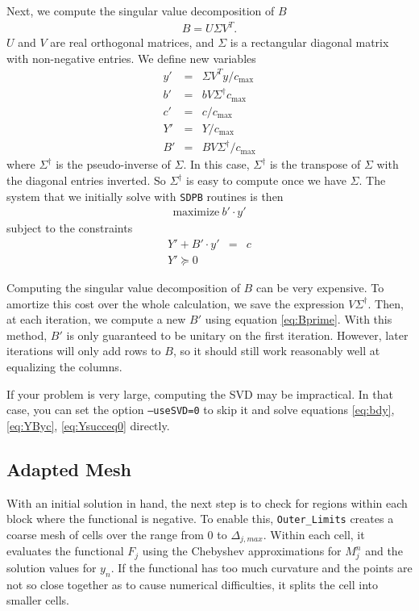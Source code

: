 \documentclass[12pt]{article}
\numberwithin{equation}{section}
\begin{document}
Next, we compute the singular value decomposition of $B$
\begin{eqnarray}
  B = U \Sigma V^T.
\end{eqnarray}
$U$ and $V$ are real orthogonal matrices, and $\Sigma$ is a rectangular
diagonal matrix with non-negative entries.  We define new
variables
\begin{eqnarray}
  y' & = & \Sigma V^T y/c_{\max}\\
  b' & = & b V \Sigma^{\dagger}c_{\max}\\
  c' & = & c/c_{\max}\\
  Y' & = & Y/c_{\max}\\
  B' & = & B V \Sigma^{\dagger}/c_{\max}
           \label{eq:Bprime}
\end{eqnarray}
where $\Sigma^{\dagger}$ is the pseudo-inverse of $\Sigma$.  In this
case, $\Sigma^{\dagger}$ is the transpose of $\Sigma$ with the
diagonal entries inverted.  So $\Sigma^{\dagger}$ is easy to compute
once we have $\Sigma$.  The system that we initially solve with
\texttt{SDPB} routines is then
\begin{eqnarray}
  \textrm{maximize}~b'\cdot y'
\end{eqnarray}
subject to the constraints
\begin{eqnarray}
  Y' + B'\cdot y' & = & c\\
  Y' \succeq 0
\end{eqnarray}

Computing the singular value decomposition of $B$ can be very
expensive.  To amortize this cost over the whole calculation, we
save the expression $V \Sigma^{\dagger}$.  Then, at each iteration, we
compute a new $B'$ using equation \ref{eq:Bprime}.  With this method,
$B'$ is only guaranteed to be unitary on the first iteration.
However, later iterations will only add rows to $B$, so it should
still work reasonably well at equalizing the columns.

If your problem is very large, computing the SVD may be impractical.
In that case, you can set the option \texttt{--useSVD=0} to skip it
and solve equations \ref{eq:bdy}, \ref{eq:YByc}, \ref{eq:Ysucceq0}
directly.

\subsection{Adapted Mesh}
\label{subsec:adaptedmesh}

With an initial solution in hand, the next step is to check for
regions within each block where the functional is negative.  To enable
this, \texttt{Outer\_Limits} creates a coarse mesh of
cells over the range from $0$ to $\Delta_{j,max}$.  Within each cell,
it evaluates the functional $F_j$ using the Chebyshev approximations
for $M_j^n$ and the solution values for $y_n$.  If the functional has
too much curvature and the points are not so close together as to
cause numerical difficulties, it splits the cell into smaller cells.
\end{document}
